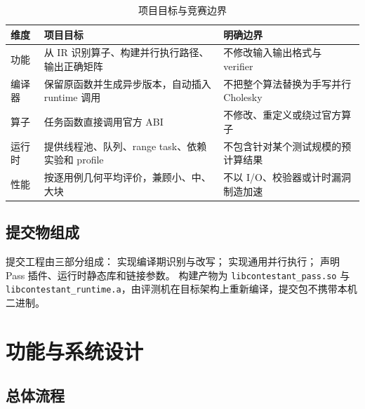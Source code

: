 \documentclass[UTF8,a4paper,openany,11pt,fontset=fandol]{ctexrep}
\begin{document}
\begin{table}[H]
  \centering
  \caption{项目目标与竞赛边界}
  \begin{tabularx}{\textwidth}{L{3.0cm}Y Y}
    \toprule
    维度 & 项目目标 & 明确边界 \\
    \midrule
    功能 & 从 IR 识别算子、构建并行执行路径、输出正确矩阵 & 不修改输入输出格式与 verifier \\
    编译器 & 保留原函数并生成异步版本，自动插入 runtime 调用 & 不把整个算法替换为手写并行 Cholesky \\
    算子 & 任务函数直接调用官方 ABI & 不修改、重定义或绕过官方算子 \\
    运行时 & 提供线程池、队列、range task、依赖实验和 profile & 不包含针对某个测试规模的预计算结果 \\
    性能 & 按逐用例几何平均评价，兼顾小、中、大块 & 不以 I/O、校验器或计时漏洞制造加速 \\
    \bottomrule
  \end{tabularx}
\end{table}

\section{提交物组成}

提交工程由三部分组成： 实现编译期识别与改写；
 实现通用并行执行；
 声明 Pass 插件、运行时静态库和链接参数。
构建产物为 \texttt{libcontestant\_pass.so} 与
\texttt{libcontestant\_runtime.a}，由评测机在目标架构上重新编译，提交包不携带本机二进制。

\chapter{功能与系统设计}

\section{总体流程}
\end{document}
